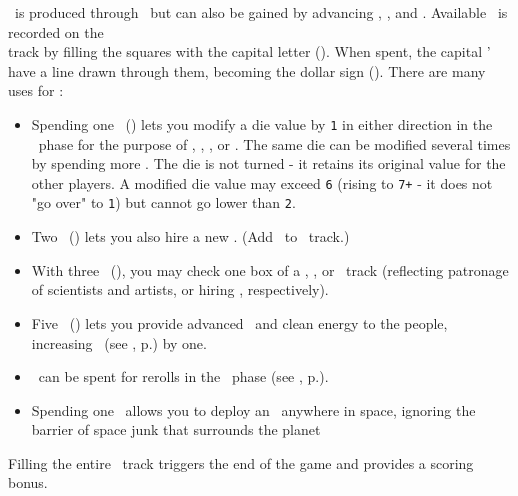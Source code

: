 \currency\ is produced through \factories\ but can also be gained by advancing 
\trade, \tech, and \culture.  Available \currency\ is recorded on the \currency\\
track by filling the squares with the capital letter (\gaincurrency). When 
spent, the capital \gaincurrency' have a line drawn through them, becoming the 
dollar sign (\spendcurrency).  There are many uses for \currency:
\begin{itemize}
  \item Spending one \currency\ (\spendcurrency) lets you modify a die value by 
        \texttt{1} in either direction in the \development\ phase for the 
        purpose of \construction, \activation, \trade, or \culture.  The same 
        die can be modified several times by spending more \currency.  The die 
        is not turned - it retains its original value for the other players.  A 
        modified die value may exceed \texttt{6} (rising to \texttt{7+} - it 
        does not "go over" to \texttt{1}) but cannot go lower than \texttt{2}.
  \item Two \currency\ (\spendcurrency\spendcurrency) lets you also hire a new 
        \astronaut.  (Add \gainastronautsymbol\ to \population\ track.)
  \item With three \currency\ (\spendcurrency\spendcurrency\spendcurrency), you
        may check one box of a \tech, \culture, or \military\ track (reflecting 
        patronage of scientists and artists, or hiring \pilots, respectively).
  \item Five \currency\ 
        (\spendcurrency\spendcurrency\spendcurrency\spendcurrency\spendcurrency)
        lets you provide advanced \tech\ and clean energy to the people, 
        increasing \happiness\ (see \nameref{sec:happiness}, 
        p.\pageref{sec:happiness}) by one.
  \item \currency\ can be spent for rerolls in the \diplomacy\ phase (see 
        \nameref{sec:diplomacy}, p.\pageref{sec:diplomacy}).
  \item Spending one \currency\ allows you to deploy an \armament\ anywhere in 
        space, ignoring the barrier of space junk that surrounds the planet
\end{itemize}
Filling the entire \currency\ track triggers the end of the game and provides a 
scoring bonus.
